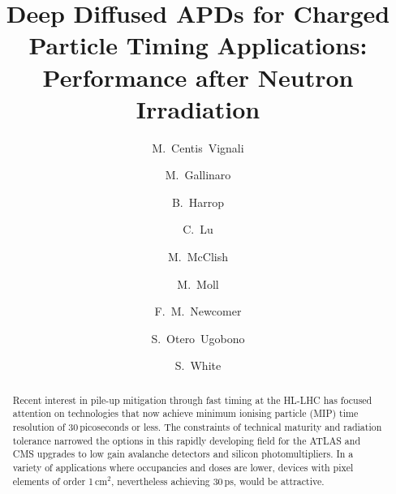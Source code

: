 \documentclass[review,number,sort&compress]{elsarticle}
\begin{document}
\begin{frontmatter}

\title{Deep Diffused APDs for Charged Particle Timing Applications: Performance after Neutron Irradiation}

\author[cern]{M.~Centis~Vignali}

\author[cern,lip]{M.~Gallinaro}
\author[uprinc]{B.~Harrop}
\author[uprinc]{C.~Lu}
\author[rmd]{M.~McClish}
\author[cern]{M.~Moll}
\author[upenn]{F.~M.~Newcomer}
\author[cern,usan]{S.~Otero~Ugobono}
\author[cern,uvirg]{S.~White}

\address[cern]{CERN, Geneva, Switzerland}
\address[lip]{LIP, Lisbon, Portugal}
\address[uprinc]{Princeton University, Princeton, USA}
\address[rmd]{Radiation Monitoring Devices, Watertown, USA}
\address[upenn]{University of Pennsylvania, Philadelphia, USA}
\address[usan]{Universidade de Santiago de Compostela, Santiago de Compostela, Spain}
\address[uvirg]{University of Virginia, Charlottesville, USA}

\begin{abstract}

Recent interest in pile-up mitigation through fast timing at the HL-LHC has focused attention on technologies that now achieve minimum ionising particle (MIP) time resolution of 30\,picoseconds or less.
The constraints of technical maturity and radiation tolerance narrowed the options in this rapidly developing field for the ATLAS and CMS upgrades to low gain avalanche detectors and silicon photomultipliers.
In a variety of applications where occupancies and doses are lower, devices with pixel elements of order 1\,cm$^2$, nevertheless achieving 30\,ps, would be attractive.
  

\end{abstract}
\end{frontmatter}
\end{document}
